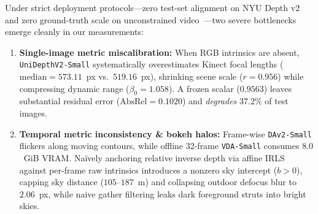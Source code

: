 \documentclass[10pt,twocolumn,letterpaper]{article}
\begin{document}
Under strict deployment protocols---zero test-set alignment on NYU Depth v2~\cite{silberman2012nyu,eigen2014depth} and zero ground-truth scale on unconstrained video~\cite{perazzi2016davis}---two severe bottlenecks emerge cleanly in our measurements:
\begin{enumerate}
  \item \textbf{Single-image metric miscalibration:} When RGB intrinsics are absent, \texttt{UniDepthV2-Small} systematically overestimates Kinect focal lengths ($\mathrm{median}=573.11$~px vs.\ $519.16$~px), shrinking scene scale ($r=0.956$) while compressing dynamic range ($\beta_0=1.058$). A frozen scalar ($0.9563$) leaves substantial residual error ($\mathrm{AbsRel}=0.1020$) and \emph{degrades} $37.2\%$ of test images.
  \item \textbf{Temporal metric inconsistency \& bokeh halos:} Frame-wise \texttt{DAv2-Small} flickers along moving contours, while offline 32-frame \texttt{VDA-Small} consumes $8.0$~GiB VRAM. Na\"ively anchoring relative inverse depth via affine IRLS against per-frame raw intrinsics introduces a nonzero sky intercept ($b>0$), capping sky distance ($105$--$187$~m) and collapsing outdoor defocus blur to $2.06$~px, while naive gather filtering leaks dark foreground struts into bright skies.
\end{enumerate}
\end{document}
